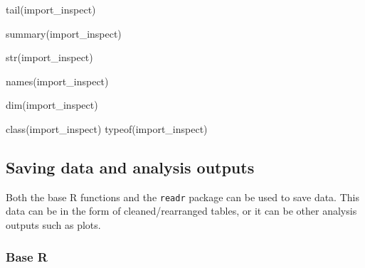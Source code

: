 \documentclass[
  letterpaper,
  DIV=11,
  numbers=noendperiod]{scrreprt}
\newenvironment{Shaded}{}{}
\newcommand{\FunctionTok}[1]{\textcolor[rgb]{0.44,0.26,0.76}{#1}}
\newcommand{\NormalTok}[1]{\textcolor[rgb]{0.14,0.16,0.18}{#1}}
\begin{document}
\begin{Shaded}
\begin{Highlighting}[]
\FunctionTok{tail}\NormalTok{(import\_inspect)}
\end{Highlighting}
\end{Shaded}

\begin{Shaded}
\begin{Highlighting}[]
\FunctionTok{summary}\NormalTok{(import\_inspect)}
\end{Highlighting}
\end{Shaded}

\begin{Shaded}
\begin{Highlighting}[]
\FunctionTok{str}\NormalTok{(import\_inspect)}
\end{Highlighting}
\end{Shaded}

\begin{Shaded}
\begin{Highlighting}[]
\FunctionTok{names}\NormalTok{(import\_inspect)}
\end{Highlighting}
\end{Shaded}

\begin{Shaded}
\begin{Highlighting}[]
\FunctionTok{dim}\NormalTok{(import\_inspect)}
\end{Highlighting}
\end{Shaded}

\begin{Shaded}
\begin{Highlighting}[]
\FunctionTok{class}\NormalTok{(import\_inspect)}
\FunctionTok{typeof}\NormalTok{(import\_inspect)}
\end{Highlighting}
\end{Shaded}

\subsection{Saving data and analysis
outputs}\label{saving-data-and-analysis-outputs}

Both the base R functions and the \texttt{readr} package can be used to
save data. This data can be in the form of cleaned/rearranged tables, or
it can be other analysis outputs such as plots.

\subsubsection{Base R}\label{base-r-1}
\end{document}
